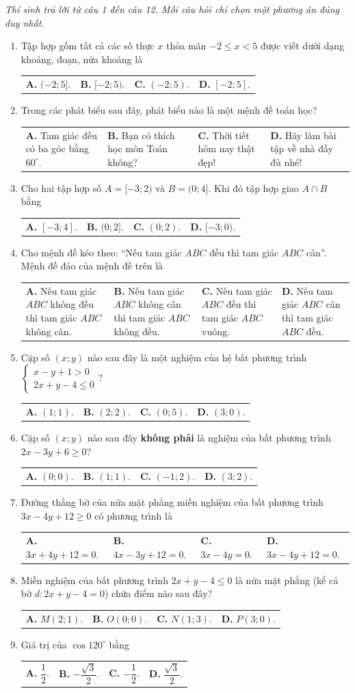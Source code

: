 \documentclass[12pt,a4paper]{article}
\makeatletter
\newcommand{\parttitle}[1]{\par\vspace{2pt}{\large\bfseries\color{ink}#1}\par\vspace{1pt}}
\newcommand{\four}[4]{\par\noindent\begin{tabularx}{\linewidth}{@{}*{4}{>{\raggedright\arraybackslash}X}@{}}\textbf{A.} #1&\textbf{B.} #2&\textbf{C.} #3&\textbf{D.} #4\end{tabularx}}
\makeatother
\begin{document}
\parttitle{PHẦN I. Trắc nghiệm nhiều lựa chọn}
\textit{Thí sinh trả lời từ câu 1 đến câu 12. Mỗi câu hỏi chỉ chọn một phương án đúng duy nhất.}
\begin{enumerate}
\item Tập hợp gồm tất cả các số thực $x$ thỏa mãn $-2 \le x < 5$ được viết dưới dạng khoảng, đoạn, nửa khoảng là
\four{$(-2; 5]$.}{$[-2; 5)$.}{$(-2; 5)$.}{$[-2; 5]$.}

\item Trong các phát biểu sau đây, phát biểu nào là một mệnh đề toán học?
\four{Tam giác đều có ba góc bằng $60^\circ$.}{Bạn có thích học môn Toán không?}{Thời tiết hôm nay thật đẹp!}{Hãy làm bài tập về nhà đầy đủ nhé!}

\item Cho hai tập hợp số $A = [-3; 2)$ và $B = (0; 4]$. Khi đó tập hợp giao $A \cap B$ bằng
\four{$[-3; 4]$.}{$(0; 2]$.}{$(0; 2)$.}{$[-3; 0)$.}

\item Cho mệnh đề kéo theo: ``Nếu tam giác $ABC$ đều thì tam giác $ABC$ cân''. Mệnh đề đảo của mệnh đề trên là
\four{Nếu tam giác $ABC$ không đều thì tam giác $ABC$ không cân.}{Nếu tam giác $ABC$ không cân thì tam giác $ABC$ không đều.}{Nếu tam giác $ABC$ đều thì tam giác $ABC$ vuông.}{Nếu tam giác $ABC$ cân thì tam giác $ABC$ đều.}

\item Cặp số $(x; y)$ nào sau đây là một nghiệm của hệ bất phương trình $\begin{cases} x - y + 1 > 0 \\ 2x + y - 4 \le 0 \end{cases}$?
\four{$(1; 1)$.}{$(2; 2)$.}{$(0; 5)$.}{$(3; 0)$.}

\item Cặp số $(x; y)$ nào sau đây \textbf{không phải} là nghiệm của bất phương trình $2x - 3y + 6 \ge 0$?
\four{$(0; 0)$.}{$(1; 1)$.}{$(-1; 2)$.}{$(3; 2)$.}

\item Đường thẳng bờ của nửa mặt phẳng miền nghiệm của bất phương trình $3x - 4y + 12 \ge 0$ có phương trình là
\four{$3x + 4y + 12 = 0$.}{$4x - 3y + 12 = 0$.}{$3x - 4y = 0$.}{$3x - 4y + 12 = 0$.}

\item Miền nghiệm của bất phương trình $2x + y - 4 \le 0$ là nửa mặt phẳng (kể cả bờ $d: 2x + y - 4 = 0$) chứa điểm nào sau đây?
\four{$M(2; 1)$.}{$O(0; 0)$.}{$N(1; 3)$.}{$P(3; 0)$.}

\item Giá trị của $\cos 120^\circ$ bằng
\four{$\dfrac{1}{2}$.}{$-\dfrac{\sqrt{3}}{2}$.}{$-\dfrac{1}{2}$.}{$\dfrac{\sqrt{3}}{2}$.}


\end{enumerate}
\end{document}
